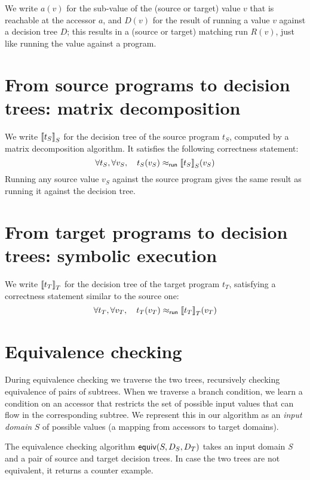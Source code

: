 \documentclass[12pt]{article}
\begin{document}
We write $a(v)$ for the sub-value of the (source or target) value $v$
that is reachable at the accessor $a$, and $D(v)$ for the result of
running a value $v$ against a decision tree $D$; this results in
a (source or target) matching run $R(v)$, just like running the value
against a program.

\section{From source programs to decision trees: matrix decomposition}

We write ${\llbracket{t_S}\rrbracket}_S$ for the decision tree of the source program
$t_S$, computed by a matrix decomposition algorithm.
It satisfies the following correctness statement:
\[
\forall t_S, \forall v_S, \quad t_S(v_S) \mathrel{\approx_{\mathsf{run}}} {\llbracket{t_S}\rrbracket}_S(v_S)
\]
Running any source value $v_S$ against the source program gives the
same result as running it against the decision tree.


\section{From target programs to decision trees: symbolic execution}

We write ${\llbracket{t_T}\rrbracket}_T$ for the decision tree of the target program
$t_T$, satisfying a correctness statement similar to the source one:
\[
\forall t_T, \forall v_T, \quad t_T(v_T) \mathrel{\approx_{\mathsf{run}}} {\llbracket{t_T}\rrbracket}_T(v_T)
\]

\section{Equivalence checking}

During equivalence checking we traverse the two trees, recursively checking equivalence of pairs of subtrees.
When we traverse a branch condition, we learn a condition
on an accessor that restricts the set of possible input values that can flow in the corresponding subtree.
We represent this in our algorithm as an \emph{input domain} $S$ of possible values (a mapping from accessors to target domains).

The equivalence checking algorithm $\mathsf{equiv}(S, D_S, D_T)$ takes an input domain \emph{S} and a pair of source and target decision trees. In case the two trees are not equivalent, it returns a counter example.
\end{document}
